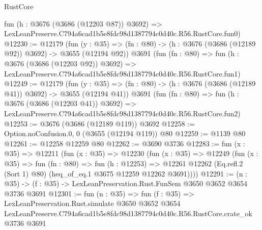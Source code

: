 \begin{lexlean}{RustCore}
\begin{coremodule}
    fun (h : @3676 (@3686 (@12203 @87)) @3692) =>
    LexLeanPreserve.C794a6cad1b5e8fdc98d1387794c0d40c.R56.RustCore.fun0)
@12230 := @12179
    (fun (y : @35) => (fn : @80) -> (h : @3676 (@3686 (@12189 @92)) @3692) -> @3655 (@12194 @92))
    @3691
    (fun (fn : @80) =>
    fun (h : @3676 (@3686 (@12203 @92)) @3692) =>
    LexLeanPreserve.C794a6cad1b5e8fdc98d1387794c0d40c.R56.RustCore.fun1)
@12249 := @12179
    (fun (y : @35) => (fn : @80) -> (h : @3676 (@3686 (@12189 @41)) @3692) -> @3655 (@12194 @41))
    @3691
    (fun (fn : @80) =>
    fun (h : @3676 (@3686 (@12203 @41)) @3692) =>
    LexLeanPreserve.C794a6cad1b5e8fdc98d1387794c0d40c.R56.RustCore.fun2)
@12253 := @3676 (@3686 (@12189 @119)) @3692
@12258 := Option.noConfusion.{0, 0} (@3655 (@12194 @119)) @80
@12259 := @1139 @80
@12261 := @12258 @12259 @80
@12262 := @3690 @3736
@12283 := fun (x : @35) =>
  @12211
    (fun (x : @35) =>
    @12230
      (fun (x : @35) =>
      @12249
        (fun (x : @35) =>
        fun (fn : @80) =>
        fun (h : @12253) =>
        @12261 @12262 (Eq.refl.{2} (Sort 1) @80) (heq_of_eq.{1} @3675 @12259 @12262 @3691))))
@12291 := (n : @35) -> (f : @35) -> LexLeanPreservation.Rust.FunSem @3650 @3652 @3654 @3736 @3691
@12301 := fun (n : @35) =>
  fun (f : @35) =>
  LexLeanPreservation.Rust.simulate
    @3650
    @3652
    @3654
    LexLeanPreserve.C794a6cad1b5e8fdc98d1387794c0d40c.R56.RustCore.crate_ok
    @3736
    @3691
\end{coremodule}
\end{lexlean}

